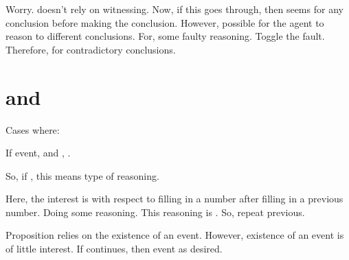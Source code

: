 \begin{note}
  \color{red}
  Worry.
   doesn't rely on witnessing.
  Now, if this goes through, then seems \support{} for any conclusion before making the conclusion.
  However, possible for the agent to reason to different conclusions.
  For, some faulty reasoning.
  Toggle the fault.
  Therefore, \support{} for contradictory conclusions.
\end{note}






\section{ and }
\label{sec:fc3-sr0}

\begin{note}
  \begin{proposition}
    Cases where:

    If event, and \sR{}, \fc{}.
  \end{proposition}

  So, if \sR{}, this means type of reasoning.

  Here, the interest is with respect to filling in a number after filling in a previous number.
  Doing some reasoning.
  This reasoning is \sR{}.
  So, repeat previous.
\end{note}

\begin{note}
  Proposition relies on the existence of an event.
  However, existence of an event is of little interest.
  If continues, then event as desired.
\end{note}

